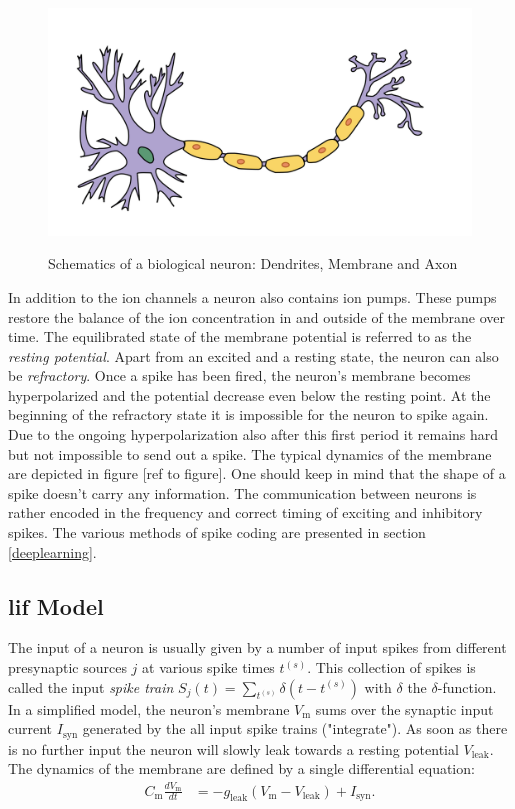 \begin{figure}
	\includegraphics[width=\linewidth]{figures/neuron_model.png}
	\label{biosynapse}
	\caption{Schematics of a biological neuron: Dendrites, Membrane and Axon}
\end{figure}


In addition to the ion channels a neuron also contains ion pumps. These pumps restore the balance of the ion concentration in and outside of the membrane over time. The equilibrated state of the membrane potential is referred to as the \textit{resting potential}. Apart from an excited and a resting state, the neuron can also be \textit{refractory}. Once a spike has been fired, the neuron's membrane becomes hyperpolarized and the potential decrease even below the resting point. At the beginning of the refractory state it is impossible for the neuron to spike again. Due to the ongoing hyperpolarization also after this first period it remains hard but not impossible to send out a spike. The typical dynamics of the membrane are depicted in figure [ref to figure]. One should keep in mind that the shape of a spike doesn't carry any information.  The communication between neurons is rather encoded in the frequency and correct timing of exciting and inhibitory spikes. The various methods of spike coding are presented in section \ref{deeplearning}. 

\subsection{\gls{lif} Model}

The input of a neuron is usually given by a number of input spikes from different presynaptic sources $j$ at various spike times $t^{(s)}$. This collection of spikes is called the input \textit{spike train} $S_j(t) = \sum_{t^{(s)}} \delta(t - t^{(s)})$ with $\delta$ the $\delta$-function. In a simplified model, the neuron's membrane $V_{\text{m}}$ sums over the synaptic input current $I_{\text{syn}}$ generated by the all input spike trains ("integrate"). As soon as there is no further input the neuron will slowly leak towards a resting potential $V_\text{leak}$. The dynamics of the membrane are defined by a single differential equation:
\begin{align}
C_{\text{m}} \frac{dV_{\text{m}}}{dt} &= -g_{\text{leak}} (V_{\text{m}} - V_{\text{leak}}) + I_{\text{syn}}.
\end{align}

